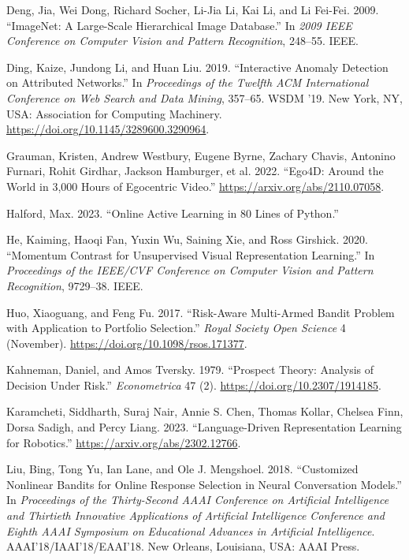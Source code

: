 \documentclass[
  letterpaper,
  numbers=noenddot,
  DIV=11]{scrreprt}
\newlength{\cslhangindent}
\newenvironment{CSLReferences}[2] %
 {\begin{list}{}{%
  \setlength{\itemindent}{0pt}
  \setlength{\leftmargin}{0pt}
  \setlength{\parsep}{0pt}
  \ifodd #1
   \setlength{\leftmargin}{\cslhangindent}
   \setlength{\itemindent}{-1\cslhangindent}
  \fi
  \setlength{\itemsep}{#2\baselineskip}}}
 {\end{list}}
\theoremstyle{plain}
\theoremstyle{definition}
\theoremstyle{remark}
\begin{document}
\begin{CSLReferences}{1}{0}
Deng, Jia, Wei Dong, Richard Socher, Li-Jia Li, Kai Li, and Li Fei-Fei.
2009. {``ImageNet: A Large-Scale Hierarchical Image Database.''} In
\emph{2009 IEEE Conference on Computer Vision and Pattern Recognition},
248--55. IEEE.

Ding, Kaize, Jundong Li, and Huan Liu. 2019. {``Interactive Anomaly
Detection on Attributed Networks.''} In \emph{Proceedings of the Twelfth
ACM International Conference on Web Search and Data Mining}, 357--65.
WSDM '19. New York, NY, USA: Association for Computing Machinery.
\url{https://doi.org/10.1145/3289600.3290964}.

Grauman, Kristen, Andrew Westbury, Eugene Byrne, Zachary Chavis,
Antonino Furnari, Rohit Girdhar, Jackson Hamburger, et al. 2022.
{``Ego4D: Around the World in 3,000 Hours of Egocentric Video.''}
\url{https://arxiv.org/abs/2110.07058}.

Halford, Max. 2023. {``Online Active Learning in 80 Lines of Python.''}

He, Kaiming, Haoqi Fan, Yuxin Wu, Saining Xie, and Ross Girshick. 2020.
{``Momentum Contrast for Unsupervised Visual Representation Learning.''}
In \emph{Proceedings of the IEEE/CVF Conference on Computer Vision and
Pattern Recognition}, 9729--38. IEEE.

Huo, Xiaoguang, and Feng Fu. 2017. {``Risk-Aware Multi-Armed Bandit
Problem with Application to Portfolio Selection.''} \emph{Royal Society
Open Science} 4 (November). \url{https://doi.org/10.1098/rsos.171377}.

Kahneman, Daniel, and Amos Tversky. 1979. {``Prospect Theory: Analysis
of Decision Under Risk.''} \emph{Econometrica} 47 (2).
\url{https://doi.org/10.2307/1914185}.

Karamcheti, Siddharth, Suraj Nair, Annie S. Chen, Thomas Kollar, Chelsea
Finn, Dorsa Sadigh, and Percy Liang. 2023. {``Language-Driven
Representation Learning for Robotics.''}
\url{https://arxiv.org/abs/2302.12766}.

Liu, Bing, Tong Yu, Ian Lane, and Ole J. Mengshoel. 2018. {``Customized
Nonlinear Bandits for Online Response Selection in Neural Conversation
Models.''} In \emph{Proceedings of the Thirty-Second AAAI Conference on
Artificial Intelligence and Thirtieth Innovative Applications of
Artificial Intelligence Conference and Eighth AAAI Symposium on
Educational Advances in Artificial Intelligence}.
AAAI'18/IAAI'18/EAAI'18. New Orleans, Louisiana, USA: AAAI Press.


\end{CSLReferences}
\end{document}
